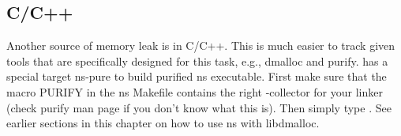 \subsection{C/C++}
\label{leakC}

Another source of memory leak is in C/C++. This is much easier to track
given tools that are specifically designed for this task, e.g., dmalloc
and purify. \ns  has a special target ns-pure to build purified ns
executable. First make sure that the macro PURIFY in the ns Makefile
contains the right -collector for your linker (check purify man page if
you don't know what this is). Then simply type . See
earlier sections in this chapter on how to use ns with libdmalloc. 



